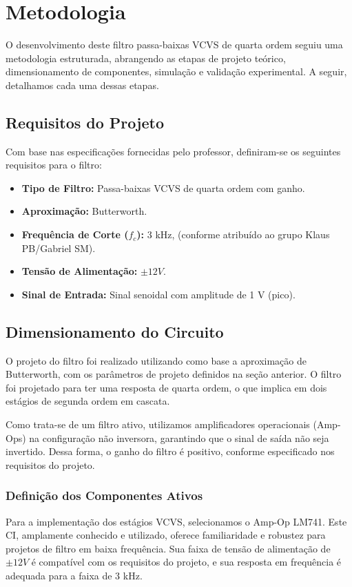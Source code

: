 \section{Metodologia}
O desenvolvimento deste filtro passa-baixas VCVS de quarta ordem seguiu uma metodologia estruturada, abrangendo as etapas de projeto teórico, dimensionamento de componentes, simulação e validação experimental. A seguir, detalhamos cada uma dessas etapas.

\subsection{Requisitos do Projeto}
Com base nas especificações fornecidas pelo professor, definiram-se os seguintes requisitos para o filtro:

\begin{itemize}
    \item \textbf{Tipo de Filtro:} Passa-baixas VCVS de quarta ordem com ganho.
    \item \textbf{Aproximação:} Butterworth.
    \item \textbf{Frequência de Corte ($f_c$):} 3 kHz, (conforme atribuído ao grupo Klaus PB/Gabriel SM).
    \item \textbf{Tensão de Alimentação:} $\pm12 V$.
    \item \textbf{Sinal de Entrada:} Sinal senoidal com amplitude de 1 V (pico).
\end{itemize}

\subsection{Dimensionamento do Circuito}
O projeto do filtro foi realizado utilizando como base a aproximação de Butterworth, com os parâmetros de projeto definidos na seção anterior. O filtro foi projetado para ter uma resposta de quarta ordem, o que implica em dois estágios de segunda ordem em cascata.

Como trata-se de um filtro ativo, utilizamos amplificadores operacionais (Amp-Ops) na configuração não inversora, garantindo que o sinal de saída não seja invertido. Dessa forma, o ganho do filtro é positivo, conforme especificado nos requisitos do projeto.

\subsubsection{Definição dos Componentes Ativos}
Para a implementação dos estágios VCVS, selecionamos o Amp-Op LM741. Este CI, amplamente conhecido e utilizado, oferece familiaridade e robustez para projetos de filtro em baixa frequência. Sua faixa de tensão de alimentação de $\pm12 V$ é compatível com os requisitos do projeto, e sua resposta em frequência é adequada para a faixa de 3 kHz.

